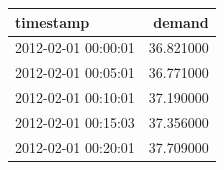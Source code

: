 \begin{tabular}{lr}
\toprule
 timestamp &  demand \\
\midrule
 2012-02-01 00:00:01 & 36.821000 \\
 2012-02-01 00:05:01 & 36.771000 \\
 2012-02-01 00:10:01 & 37.190000 \\
 2012-02-01 00:15:03 & 37.356000 \\
 2012-02-01 00:20:01 & 37.709000 \\
\bottomrule
\end{tabular}

